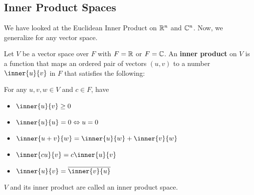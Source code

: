 \documentclass{article}
\begin{document}
\subsection{Inner Product Spaces}
\begin{remark}
  We have looked at the Euclidean Inner Product on $\mathbb{R}^n$ and $\mathbb{C}^n$. Now, we generalize for any vector space.
\end{remark}
\begin{definition}
  Let $V$ be a vector space over $F$ with $F = \mathbb{R}$ or $F = \mathbb{C}$. An \textbf{inner product} on $V$ is a function that maps an ordered pair of vectors $(u, v)$ to a number $\inner{u}{v}$ in $F$ that satisfies the following:

  For any $u, v, w \in V$ and $c \in F$, have
  \begin{itemize}
    \item $\inner{u}{v} \geq 0$
    \item $\inner{u}{u} = 0 \iff u = 0$
    \item $\inner{u+v}{w} = \inner{u}{w} + \inner{v}{w}$
    \item $\inner{cu}{v} = c\inner{u}{v}$
    \item $\inner{u}{v} = \overline{\inner{v}{u}}$
  \end{itemize}

  $V$ and its inner product are called an inner product space.
\end{definition}
\end{document}
